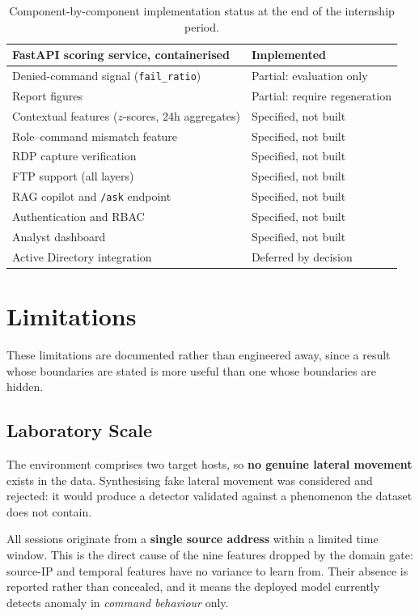\documentclass{classeENS}
\begin{document}
\begin{table}[H]
\begin{tabular}{|l|l|}
FastAPI scoring service, containerised & Implemented \\
\hline
Denied-command signal (\texttt{fail\_ratio}) & Partial: evaluation only \\
Report figures & Partial: require regeneration \\
\hline
Contextual features ($z$-scores, 24h aggregates) & Specified, not built \\
Role--command mismatch feature & Specified, not built \\
RDP capture verification & Specified, not built \\
FTP support (all layers) & Specified, not built \\
RAG copilot and \texttt{/ask} endpoint & Specified, not built \\
Authentication and RBAC & Specified, not built \\
Analyst dashboard & Specified, not built \\
Active Directory integration & Deferred by decision \\
\hline
\end{tabular}
\caption{Component-by-component implementation status at the end of the internship period.}
\label{tab:status}
\end{table}

\section{Limitations}
\label{sec:limits}

These limitations are documented rather than engineered away, since a result whose boundaries are stated is more useful than one whose boundaries are hidden.

\subsection{Laboratory Scale}
The environment comprises two target hosts, so \textbf{no genuine lateral movement} exists in the data. Synthesising fake lateral movement was considered and rejected: it would produce a detector validated against a phenomenon the dataset does not contain.

All sessions originate from a \textbf{single source address} within a limited time window. This is the direct cause of the nine features dropped by the domain gate: source-IP and temporal features have no variance to learn from. Their absence is reported rather than concealed, and it means the deployed model currently detects anomaly in \emph{command behaviour} only.
\end{document}
